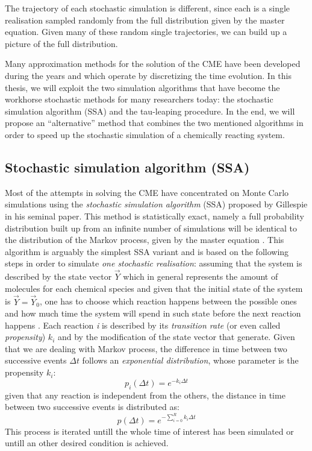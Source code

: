 \documentclass[12pt,a4paper]{report}
\begin{document}
The trajectory of each stochastic simulation is different, since each is a single realisation sampled randomly from the full distribution given by the master equation. Given many of these random single trajectories, we can build up a picture of the full distribution.

Many approximation methods for the solution of the CME have been developed during the years and which operate by discretizing the time evolution. In this thesis, we will exploit the two simulation algorithms that have become the workhorse stochastic methods for many researchers today: the stochastic simulation algorithm (SSA) and the tau-leaping procedure. In the end, we will propose an ``alternative'' method that combines the two mentioned algorithms in order to speed up the stochastic simulation of a chemically reacting system. 

\subsection{Stochastic simulation algorithm (SSA)}
Most of the attempts in solving the CME have concentrated on Monte Carlo simulations using the \emph{stochastic simulation algorithm} (SSA) proposed by Gillespie in his seminal paper. This method is statistically exact, namely a full probability distribution built up from an infinite number of simulations will be identical to the distribution of the Markov process, given by the master equation \cite{Article}. This algorithm is arguably the simplest SSA variant and is based on the following steps in order to simulate \emph{one stochastic realisation}: assuming that the system is described by the state vector $\Vec{Y}$ which in general represents the amount of molecules for each chemical species and given that the initial state of the system is $\Vec{Y} = \Vec{Y}_{0}$, one has to choose which reaction happens between the possible ones and how much time the system will spend in such state before the next reaction happens \cite{PHD}. Each reaction \emph{i} is described by its \emph{transition rate} (or even called \emph{propensity}) $k_{i}$ and by the modification of the state vector that generate. Given that we are dealing with Markov process, the difference in time between two successive events $\Delta t$ follows an \emph{exponential distribution}, whose parameter is the propensity $k_{i}$:
\begin{equation}
    p_{i}(\Delta t) = e^{-k_{i}\Delta t}
\end{equation}
given that any reaction is independent from the others, the distance in time between two successive events is distributed as:
\begin{equation}\label{exponential}
    p(\Delta t) = e^{-\sum_{i=0}^{R} k_{i} \Delta t}
\end{equation}
This process is iterated untill the whole time of interest has been simulated or untill an other desired condition is achieved.
\end{document}

